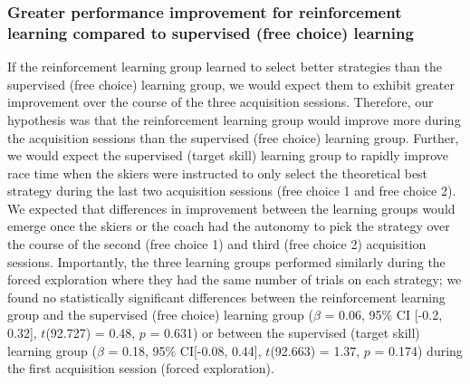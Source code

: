 \subsubsection{Greater performance improvement for  reinforcement learning  compared to supervised (free choice) learning}\label{result_racetime_acquisition}
If the reinforcement learning group learned to select better strategies than the supervised (free choice) learning group, we would expect them to exhibit greater improvement over the course of the three acquisition sessions. Therefore, our hypothesis was that the reinforcement learning group would improve more during the acquisition sessions than the supervised (free choice) learning group. Further, we would expect the supervised (target skill) learning group to rapidly improve race time when the skiers were instructed to only select the theoretical best strategy during the last two acquisition sessions (free choice 1 and free choice 2). 
We expected that differences in improvement between the learning groups would emerge once the skiers or the coach had the autonomy to pick the strategy over the course of the second (free choice 1) and third (free choice 2) acquisition sessions. Importantly, the three learning groups performed similarly during the forced exploration where they had the same number of trials on each strategy; we found no statistically significant differences between the reinforcement learning group and the supervised (free choice) learning group ($\beta$ = 0.06, 95\% CI [-0.2, 0.32], $t$(92.727) = 0.48, $p$ = 0.631) or between the supervised (target skill) learning group ($\beta$ = 0.18, 95\% CI[-0.08, 0.44], $t$(92.663) = 1.37, $p$ = 0.174) during the first acquisition session (forced exploration).  

